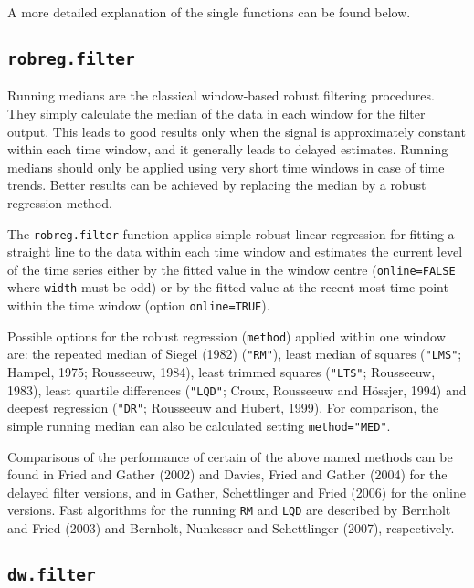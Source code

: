 \documentclass[a4paper]{scrartcl}
\begin{document}
\noindent
A more detailed explanation of the single functions can be found
below.

\subsection{\texttt{robreg.filter}}

Running medians are the classical window-based robust filtering
procedures. They simply calculate the median of the data in each
window for the filter output. This leads to good results only when
the signal is approximately constant within each time window, and
it generally leads to delayed estimates. Running medians should
only be applied using very short time windows in case of time
trends. Better results %
can be achieved by replacing the median by a robust regression
method.

The \texttt{robreg.filter} function applies  simple robust linear
regression for fitting a straight line to the data within each time
window and estimates the current level of the time series either by
the fitted value in the window centre (\texttt{online=FALSE} where
\texttt{width} must be odd) or by the fitted value at the recent
most time point within the time window (option
\texttt{online=TRUE}).

Possible options for the robust regression (\texttt{method})
applied within one window are: the repeated median of Siegel
(1982) (\texttt{"RM"}), least median of squares (\texttt{"LMS"};
Hampel, 1975; Rousseeuw, 1984), least trimmed squares
(\texttt{"LTS"}; Rousseeuw, 1983), least quartile differences
(\texttt{"LQD"}; Croux, Rousseeuw and H\"{o}ssjer, 1994) and deepest
regression (\texttt{"DR"}; Rousseeuw and Hubert, 1999). For
comparison, the simple running median can also be calculated
setting \texttt{method="MED"}.

Comparisons of the performance of certain of the above named
methods can be found in Fried and Gather (2002) and Davies, Fried
and Gather (2004)  for the delayed filter versions, and in Gather,
Schettlinger and Fried (2006) for the online versions. Fast
algorithms for the running \texttt{RM} and \texttt{LQD} are
described by Bernholt and Fried (2003) and Bernholt, Nunkesser and
Schettlinger (2007), respectively.

\subsection{\texttt{dw.filter}}
\end{document}
